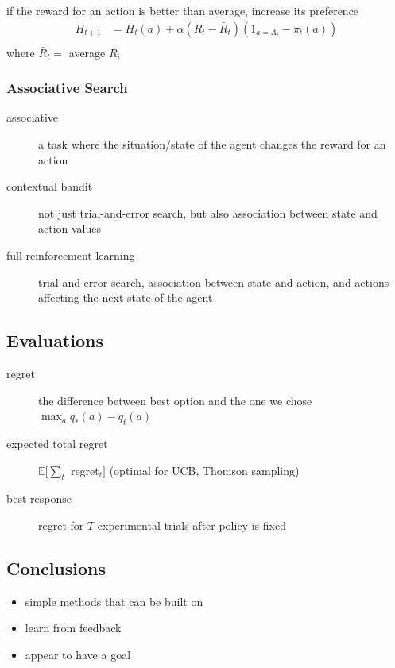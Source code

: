\documentclass[]{article}
\theoremstyle{definition}
\newcommand{\E}{\mathbb{E}}
\begin{document}
if the reward for an action is better than average, increase its preference
\begin{eqnarray*}
    H_{t+1} &= H_t(a) + \alpha(R_t - \bar R_t)(1_{a = A_t} - \pi_t(a)) \\
\end{eqnarray*}
where $\bar R_t = $ average $R_i$

\subsubsection{Associative Search}
\label{ssub:associative_search}

\begin{description}
    \item[associative] a task where the situation/state of the agent changes the reward for an action
    \item[contextual bandit] not just trial-and-error search, but also association between state and action values 
    \item[full reinforcement learning] trial-and-error search, association between state and action, and actions affecting the next state of the agent
\end{description}


\subsection{Evaluations}
\label{sub:evaluations}
\begin{description}
    \item[regret] the difference between best option and the one we chose $\max_a q_*(a) - q_t(a)$
    \item[expected total regret] $\E[\sum_t $ regret$_t]$ (optimal for UCB, Thomson sampling)
    \item[best response] regret for $T$ experimental trials after policy is fixed
\end{description}

\subsection{Conclusions}
\label{sub:conclusions}
\begin{itemize}
    \item simple methods that can be built on
    \item learn from feedback
    \item appear to have a goal
\end{itemize}
\end{document}
